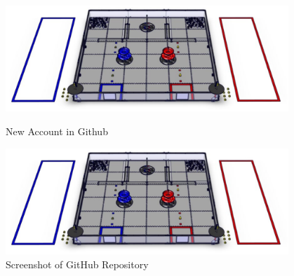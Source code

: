\begin{figure}[ht]
\centering
\begin{minipage}[b]{.48\textwidth}
  \centering
  \includegraphics[width=0.95\textwidth]{Meetings/September/09-18-21/field.png}
  \caption{New Account in Github}
  \label{fig:pic1}
\end{minipage}%
\hfill%
\begin{minipage}[b]{.48\textwidth}
  \centering
  \includegraphics[width=0.95\textwidth]{Meetings/September/09-18-21/field.png}
  \caption{Screenshot of GitHub Repository}
  \label{fig:pic2}
\end{minipage}
\end{figure}







